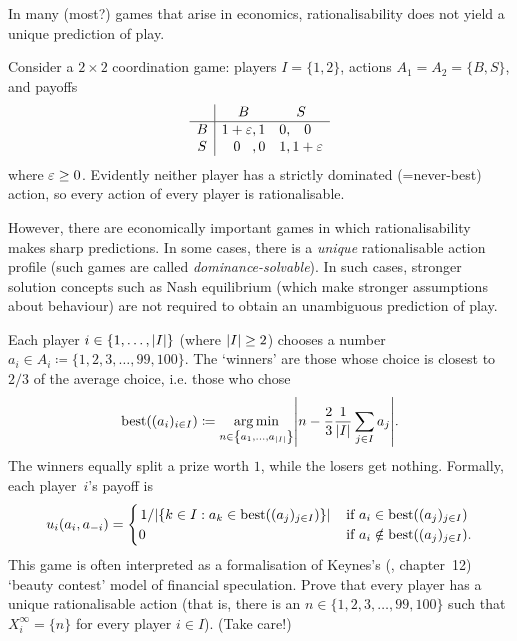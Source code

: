 In many (most?) games that arise in economics, rationalisability does not yield a unique prediction of play.

\begin{example}
	\label{example:BoS}
	Consider a $2 \times 2$ coordination game: players $I=\{1,2\}$, actions $A_1 = A_2 = \{B,S\}$, and payoffs
	\begin{equation*}
		\begin{array}{c|cc}
			  & B        & S \\ \hline
			B & 1+\eps,1 & 0,\parbox{\widthof{$1+\eps$}}{\centering\vphantom{dp}$0$} \\
			S & \parbox{\widthof{$1+\eps$}}{\centering\vphantom{dp}$0$},0      & 1,1+\eps
		\end{array}
	\end{equation*}
	where $\varepsilon \geq 0$. Evidently neither player has a strictly dominated (=never-best) action, so every action of every player is rationalisable.
\end{example}

However, there are economically important games in which rationalisability makes sharp predictions. In some cases, there is a \emph{unique} rationalisable action profile (such games are called \emph{dominance-solvable}). In such cases, stronger solution concepts such as Nash equilibrium (which make stronger assumptions about behaviour) are not required to obtain an unambiguous prediction of play.

\begin{exercise}
	\label{exercise:nagel}
	Each player $i \in \{1,\dots,\abs*{I}\}$ (where $\abs*{I} \geq 2$) chooses a number $a_i \in A_i \coloneqq \{1,2,3,\dots,99,100\}$. The `winners' are those whose choice is closest to $2/3$ of the average choice, i.e. those who chose
	\begin{equation*}
		\text{best}((a_i)_{i \in I})
		\coloneqq \argmin_{n \in \left\{a_1,\dots,a_{\abs*{I}}\right\}}
		\abs*{ n - \frac{2}{3} \frac{1}{\abs*{I}} \sum_{j \in I} a_j } .
	\end{equation*}
	The winners equally split a prize worth $1$, while the losers get nothing. Formally, each player~$i$'s payoff is
	\begin{equation*}
		u_i(a_i,a_{-i})
		= \begin{cases}
			\left. 1 \middle/ \abs*{ \left\{ k \in I : a_k \in \text{best}\left((a_j)_{j \in I}\right) \right\} } \right.
			& \text{if $a_i \in \text{best}\left((a_j)_{j \in I}\right)$}
			\\
			0
			& \text{if $a_i \notin \text{best}\left((a_j)_{j \in I}\right)$.}
		\end{cases}
	\end{equation*}
	This game is often interpreted as a formalisation of Keynes's (\citeyear{Keynes1936}, chapter~12) `beauty contest' model of financial speculation.
	Prove that every player has a unique rationalisable action (that is, there is an $n \in \{1,2,3,\dots,99,100\}$ such that $X^\infty_i = \{n\}$ for every player $i \in I$). (Take care!)
\end{exercise}

